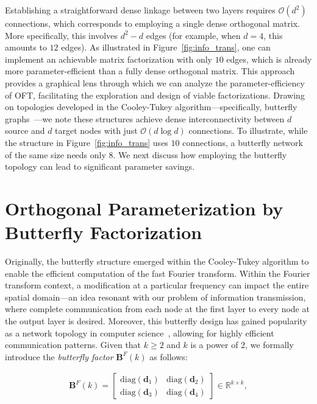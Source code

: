 Establishing a straightforward dense linkage between two layers requires $\mathcal{O}(d^2)$ connections, which corresponds to employing a single dense orthogonal matrix. More specifically, this involves $d^2 - d$ edges (for example, when $d=4$, this amounts to $12$ edges). As illustrated in Figure~\ref{fig:info_trans}, one can implement an achievable matrix factorization with only $10$ edges, which is already more parameter-efficient than a fully dense orthogonal matrix. This approach provides a graphical lens through which we can analyze the parameter-efficiency of OFT, facilitating the exploration and design of viable factorizations. Drawing on topologies developed in the Cooley-Tukey algorithm—specifically, butterfly graphs~\cite{cooley1965algorithm}—we note these structures achieve dense interconnectivity between $d$ source and $d$ target nodes with just $\mathcal{O}(d\log d)$ connections. To illustrate, while the structure in Figure~\ref{fig:info_trans} uses $10$ connections, a butterfly network of the same size needs only $8$. We next discuss how employing the butterfly topology can lead to significant parameter savings.

\section{Orthogonal Parameterization by Butterfly Factorization}

Originally, the butterfly structure emerged within the Cooley-Tukey algorithm to enable the efficient computation of the fast Fourier transform. Within the Fourier transform context, a modification at a particular frequency can impact the entire spatial domain—an idea resonant with our problem of information transmission, where complete communication from each node at the first layer to every node at the output layer is desired. Moreover, this butterfly design has gained popularity as a network topology in computer science~\cite{solihin2015fundamentals,li2011linear}, allowing for highly efficient communication patterns. Given that $k \geq 2$ and $k$ is a power of $2$, we formally introduce the \emph{butterfly factor} $\bm{B}^F(k)$ as follows:

\begin{equation}\label{eq:but_factor}
\begin{aligned}
    \bm{B}^F(k)=\begin{bmatrix}
    \text{diag}(\bm{d}_1) & \text{diag}(\bm{d}_2) \\
    \text{diag}(\bm{d}_3) & \text{diag}(\bm{d}_4)
    \end{bmatrix}\in\mathbb{R}^{k\times k},
\end{aligned}
\end{equation}


